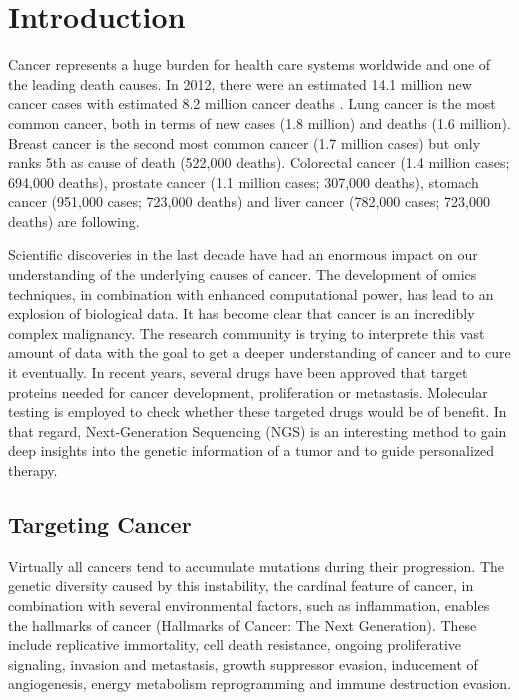 \section{Introduction}

  Cancer represents a huge burden for health care systems worldwide and one of
  the leading death causes. In 2012, there were an estimated 14.1 million new
  cancer cases with estimated  8.2 million cancer deaths
  {\cite{cancer_stats_worldwide:2012}}. Lung cancer is the most common cancer,
  both in terms of new cases (1.8 million) and deaths (1.6 million). Breast
  cancer is the second most common cancer (1.7 million cases) but only ranks 5th
  as cause of death (522,000 deaths). Colorectal cancer (1.4 million cases;
  694,000 deaths), prostate cancer (1.1 million cases; 307,000 deaths), stomach
  cancer (951,000 cases; 723,000 deaths) and liver cancer (782,000 cases;
  723,000 deaths) are following.

  Scientific discoveries in the last decade have had an enormous impact on our
  understanding of the underlying causes of cancer. The development of omics
  techniques, in combination with enhanced computational power, has lead to an
  explosion of biological data. It has become clear that cancer is an incredibly
  complex malignancy. The research community is trying to interprete this vast
  amount of data with the goal to get a deeper understanding of cancer and to
  cure it eventually. In recent years, several drugs have been approved that
  target proteins needed for cancer development, proliferation or metastasis.
  Molecular testing is employed to check whether these targeted drugs would be
  of benefit. In that regard, Next-Generation Sequencing (NGS) is an interesting
  method to gain deep insights into the genetic information of a tumor and to
  guide personalized therapy.

  \subsection{Targeting Cancer}

    Virtually all cancers tend to accumulate mutations during their progression.
    The genetic diversity caused by this instability, the cardinal feature of
    cancer, in combination with several environmental factors, such as
    inflammation, enables the hallmarks of cancer (Hallmarks of Cancer: The Next
    Generation). These include replicative immortality, cell death resistance,
    ongoing proliferative signaling, invasion and metastasis, growth suppressor
    evasion, inducement of angiogenesis, energy metabolism reprogramming and
    immune destruction evasion.


